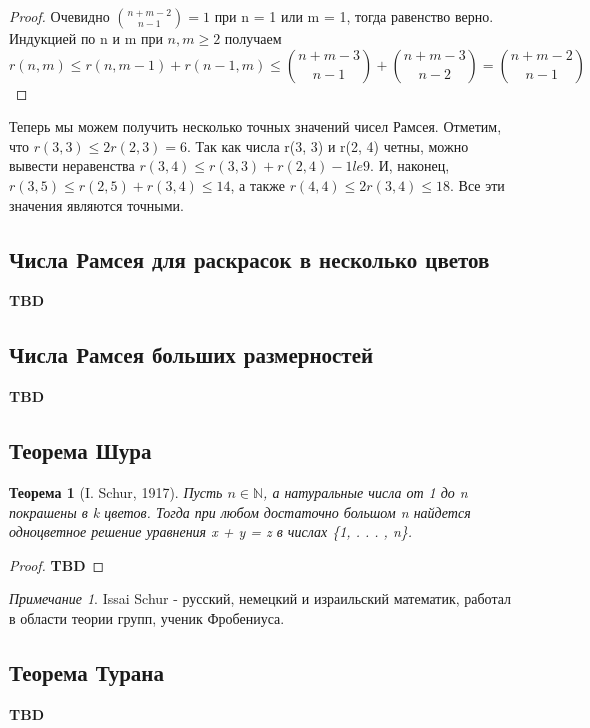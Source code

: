 \documentclass{article}
\renewcommand{\le}{\leqslant}
\renewcommand{\ge}{\geqslant}
\newtheorem{theorem}{Теорема}
\theoremstyle{definition}
\theoremstyle{remark}
\newtheorem*{remark}{Примечание}
\begin{document}
\begin{proof}
    Очевидно $\binom{n+m-2}{n-1} = 1$ при n = 1 или m = 1, тогда равенство верно. Индукцией по n и m при $n, m \ge 2$ получаем
    $$
    r(n, m) \le r(n, m - 1) + r(n - 1, m) \le  \binom{n+m-3}{n-1} + \binom{n+m-3}{n-2} = \binom{n+m-2}{n-1}
    $$
\end{proof}

Теперь мы можем получить несколько точных значений чисел Рамсея. Отметим, что
$r(3, 3) \le 2r(2, 3) = 6$. Так как числа r(3, 3) и r(2, 4) четны, можно вывести неравенства $r(3, 4) \le r(3, 3) + r(2, 4) - 1 le 9$. И, наконец, $r(3, 5) \le
r(2, 5) + r(3, 4) \le 14$, а также $r(4, 4) \le 2r(3, 4) \le 18$. Все эти значения
являются точными.

\subsection{Числа Рамсея для раскрасок в несколько цветов}
    \textbf{TBD}

\subsection{Числа Рамсея больших размерностей}
    \textbf{TBD}

\subsection{Теорема Шура}

\begin{theorem} [I. Schur, 1917]
    Пусть $n \in \mathbb{N}$, а натуральные числа от
1 до n покрашены в k цветов. Тогда при любом достаточно большом n
найдется одноцветное решение уравнения x + y = z в числах \{1, . . . , n\}.
\end{theorem}

\begin{proof}
    \textbf{TBD}
\end{proof}

\begin{remark}
   Issai Schur - русский, немецкий и израильский математик, работал в области теории групп, ученик Фробениуса.
\end{remark}


\subsection{Теорема Турана}

\textbf{TBD}
\end{document}
